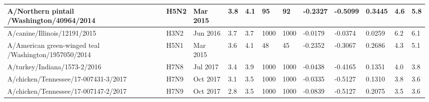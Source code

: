 \begin{tabular}{L{1.25in}|L{.35in}|L{.3in}|L{.3in}|L{.3in}|L{.35in}|L{.35in}|L{.35in}|L{.35in}|L{.32in}|L{.3in}|L{.3in}}
 A/Northern  pintail /Washington/40964/2014 &H5N2& Mar  2015 &3.8&4.1&95&92&-0.2327&-0.5099&0.3445&4.6&5.8\\\hline
 A/canine/Illinois/12191/2015 &H3N2& Jun  2016 &3.7&3.7&1000&1000&-0.0179&-0.0374&0.0259&6.2&6.1\\\hline
 A/American  green-winged  teal /Washington/1957050/2014 &H5N1& Mar  2015 &3.6&4.1&48&45&-0.2352&-0.3067&0.2686&4.3&5.1\\\hline
 A/turkey/Indiana/1573-2/2016 &H7N8& Jul  2017 &3.4&3.9&1000&1000&-0.0438&-0.4165&0.1351&4.0&3.8\\\hline
 A/chicken/Tennessee/17-007431-3/2017 &H7N9& Oct  2017 &3.1&3.5&1000&1000&-0.0335&-0.5127&0.1310&3.8&3.6\\\hline
 A/chicken/Tennessee/17-007147-2/2017 &H7N9& Oct  2017 &2.8&3.5&1000&1000&-0.0839&-0.5127&0.2075&3.5&3.6\\\hline
\end{tabular}